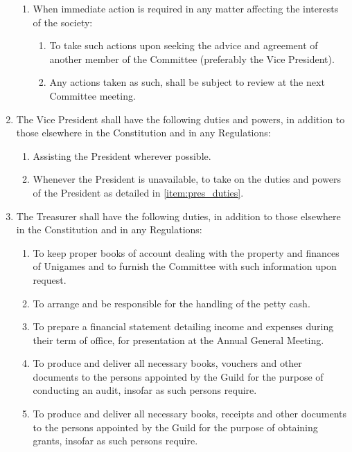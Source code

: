 \documentclass[a4paper]{article}
\begin{document}
\begin{enumerate}
\begin{enumerate}
              \item When immediate action is required in any matter affecting the interests of the society:
                    \begin{enumerate}
                        \item To take such actions upon seeking the advice and agreement of another member of the Committee (preferably the Vice President).
                        \item Any actions taken as such, shall be subject to review at the next Committee meeting.
                    \end{enumerate}
          \end{enumerate}
    \item The Vice President shall have the following duties and powers, in addition to those elsewhere in the Constitution and in any Regulations:
          \begin{enumerate}
              \item Assisting the President wherever possible.
              \item Whenever the President is unavailable, to take on the duties and powers of the President as detailed in \cref{item:pres_duties}.
          \end{enumerate}
    \item The Treasurer shall have the following duties, in addition to those elsewhere in the Constitution and in any Regulations:
          \begin{enumerate}
              \item To keep proper books of account dealing with the property and finances of Unigames and to furnish the Committee with such information upon request.
              \item To arrange and be responsible for the handling of the petty cash.
              \item To prepare a financial statement detailing income and expenses during their term of office, for presentation at the Annual General Meeting.
              \item To produce and deliver all necessary books, vouchers and other documents to the persons appointed by the Guild for the purpose of conducting an audit, insofar as such persons require.
              \item To produce and deliver all necessary books, receipts and other documents to the persons appointed by the Guild for the purpose of obtaining grants, insofar as such persons require.
          \end{enumerate}

\end{enumerate}
\end{document}
